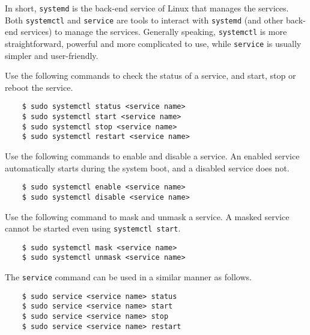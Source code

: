 In short, \verb|systemd| is the back-end service of Linux that manages the services. Both \verb|systemctl| and \verb|service| are tools to interact with \verb|systemd| (and other back-end services) to manage the services. Generally speaking, \verb|systemctl| is more straightforward, powerful and more complicated to use, while \verb|service| is usually simpler and user-friendly.

Use the following commands to check the status of a service, and start, stop or reboot the service.
\begin{lstlisting}
	$ sudo systemctl status <service name>
	$ sudo systemctl start <service name>
	$ sudo systemctl stop <service name>
	$ sudo systemctl restart <service name>
\end{lstlisting}

Use the following commands to enable and disable a service. An enabled service automatically starts during the system boot, and a disabled service does not.
\begin{lstlisting}
	$ sudo systemctl enable <service name>
	$ sudo systemctl disable <service name>
\end{lstlisting}

Use the following command to mask and unmask a service. A masked service cannot be started even using \verb|systemctl start|.
\begin{lstlisting}
	$ sudo systemctl mask <service name>
	$ sudo systemctl unmask <service name>
\end{lstlisting}

The \verb|service| command can be used in a similar manner as follows.
\begin{lstlisting}
	$ sudo service <service name> status
	$ sudo service <service name> start
	$ sudo service <service name> stop
	$ sudo service <service name> restart
\end{lstlisting}
